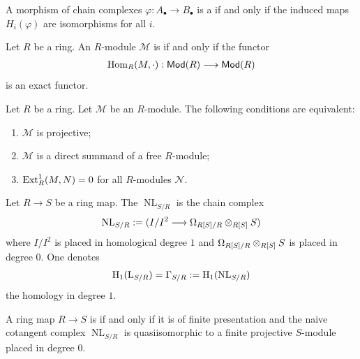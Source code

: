 \documentclass [11 pt, oneside] {article}
\begin{document}
\begin{definition}\label{}\text{}
A morphism of chain complexes $\varphi : A_\bullet \longrightarrow B_\bullet$ is a  if and only if the induced maps $H_i(\varphi)$ are isomorphisms for all $i$.
\end{definition}


\begin{definition}\label{}\text{}
Let $R$ be a ring. An $R$-module $\mathscr{M}$ is  if and only if the functor 
\begin{align*}
	\operatorname{Hom}_{R}(\relax{M}, \cdot): \textsf{Mod}(R)  \longrightarrow \textsf{Mod}(R)
\end{align*}
is an exact functor.
\end{definition}

\begin{remark}
	Let $R$ be a ring. Let $\mathscr{M}$ be an $R$-module. The following conditions are equivalent:
	\begin{enumerate}
		\item $\mathscr{M}$ is projective;
		\item $\mathscr{M}$ is a direct summand of a free $R$-module;
		\item $\operatorname{Ext}_R^1(\relax{M}, \relax{N}) =0$ for all $R$-modules $\mathscr{N}$.
	\end{enumerate}
\end{remark}

 \begin{definition}\label{}\text{}
Let $R\longrightarrow S$ be a ring map. The  $\operatorname{NL}_{S/R}$ is the chain complex 
\begin{align*}
	\operatorname{NL}_{S/R} := (I/I^2 \longrightarrow \Omega_{R[S]/R}\otimes_{R[S]} S)
\end{align*}
where $I/I^2$ is placed in homological degree $1$ and $\Omega_{R[S]/R} \otimes_{R[S]} S$ is placed in degree $0$. One denotes
\begin{align*}
	\operatorname{H}_1(\operatorname{L}_{S/R}) = \Gamma_{S/R} := \operatorname{H}_1 (\operatorname{NL}_{S/R})
\end{align*}
the homology in degree $1$.
\end{definition}



\begin{definition}\label{}\text{}
A ring map $R\longrightarrow S$ is  if and only if it is of finite presentation and the naive cotangent complex $\operatorname{NL}_{S/R}$ is quasiisomorphic to a finite projective $S$-module placed in degree $0$.
\end{definition}
\end{document}
